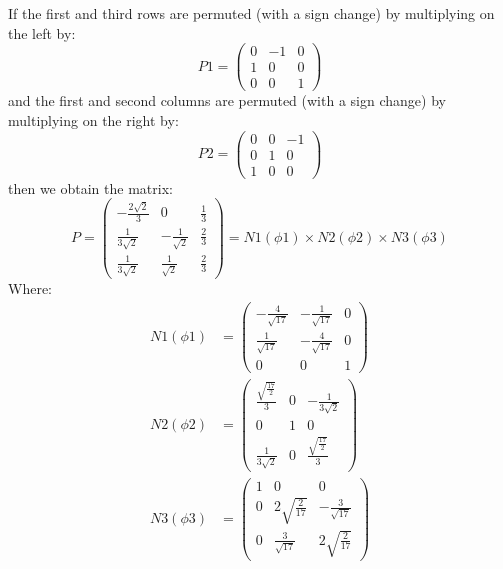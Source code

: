 \documentclass[10pt]{article}
\begin{document}
If the first and third rows are permuted (with a sign change) by multiplying on the left by:
\begin{equation*}
P1 =
\left(
\begin{array}{ccc}
 0 & -1 & 0 \\
 1 & 0 & 0 \\
 0 & 0 & 1
\end{array}
\right)
\end{equation*}
and the first and second columns are permuted (with a sign change) by multiplying on the right by:
\begin{equation*}
P2 =
\left(
\begin{array}{ccc}
 0 & 0 & -1 \\
 0 & 1 & 0 \\
 1 & 0 & 0
\end{array}
\right)
\end{equation*}
then we obtain the matrix:
\begin{equation*}
P =
\left(
\begin{array}{ccc}
 -\frac{2 \sqrt{2}}{3} & 0 & \frac{1}{3} \\[0.07in]
 \frac{1}{3 \sqrt{2}} & -\frac{1}{\sqrt{2}} & \frac{2}{3} \\[0.07in]
 \frac{1}{3 \sqrt{2}} & \frac{1}{\sqrt{2}} & \frac{2}{3}
\end{array}
\right)
= N1(\phi 1) \times N2(\phi 2) \times N3(\phi 3)
\end{equation*}
Where:
\begin{align*}
N1(\phi 1) &=
\left(
\begin{array}{ccc}
 -\frac{4}{\sqrt{17}} & -\frac{1}{\sqrt{17}} & 0 \\[0.07in]
 \frac{1}{\sqrt{17}} & -\frac{4}{\sqrt{17}} & 0 \\[0.05in]
 0 & 0 & 1
\end{array}
\right) \\
N2(\phi 2) &=
\left(
\begin{array}{ccc}
 \frac{\sqrt{\frac{17}{2}}}{3} & 0 & -\frac{1}{3 \sqrt{2}} \\[0.05in]
 0 & 1 & 0 \\
 \frac{1}{3 \sqrt{2}} & 0 & \frac{\sqrt{\frac{17}{2}}}{3}
\end{array}
\right) \\
N3(\phi 3) &=
\left(
\begin{array}{ccc}
 1 & 0 & 0 \\
 0 & 2 \sqrt{\frac{2}{17}} & -\frac{3}{\sqrt{17}} \\[0.07in]
 0 & \frac{3}{\sqrt{17}} & 2 \sqrt{\frac{2}{17}}
\end{array}
\right)
\end{align*}
\end{document}
